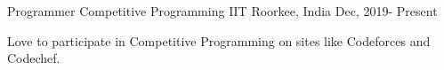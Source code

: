 \begin{cventries}
  \cventry
    {Programmer} %
    {Competitive Programming} %
    {IIT Roorkee, India} %
    {Dec, 2019- Present} %
    {
      \begin{cvitems} %
        \item {Love to participate in Competitive Programming on sites like Codeforces and Codechef.}
      \end{cvitems}
    }

\end{cventries}